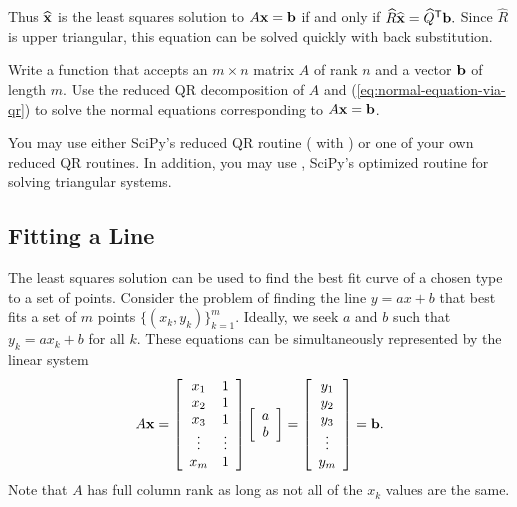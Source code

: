 Thus $\widehat{\mathbf{x}}$ is the least squares solution to $A\mathbf{x}=\mathbf{b}$ if and only if $\widehat{R}\widehat{\mathbf{x}} = \widehat{Q}^{\mathsf T}\mathbf{b}.$
Since $\widehat{R}$ is upper triangular, this equation can be solved quickly with back substitution.

\begin{problem} %
Write a function that accepts an $m \times n$ matrix $A$ of rank $n$ and a vector $\mathbf{b}$ of length $m$.
Use the reduced QR decomposition of $A$ and (\ref{eq:normal-equation-via-qr}) to solve the normal equations corresponding to $A\mathbf{x} = \mathbf{b}$.

You may use either SciPy's reduced QR routine ( with ) or one of your own reduced QR routines.
In addition, you may use , SciPy's optimized routine for solving triangular systems.
\label{prob:lstsq-via-qr}
\end{problem}

\subsection*{Fitting a Line} %

The least squares solution can be used to find the best fit curve of a chosen type to a set of points.
Consider the problem of finding the line $y = ax + b$ that best fits a set of $m$ points $\{(x_k, y_k)\}_{k=1}^m$.
Ideally, we seek $a$ and $b$ such that $y_k = ax_k + b$ for all $k$.
These equations can be simultaneously represented by the linear system
\begin{equation}
A\mathbf{x} =
\left[\begin{array}{cc}
x_1 & 1 \\
x_2 & 1 \\
x_3 & 1 \\
\vdots & \vdots \\
x_m & 1
\end{array}\right]
\left[\begin{array}{c} a \\ b \end{array}\right]
=
\left[\begin{array}{c} y_1 \\ y_2 \\ y_3 \\ \vdots \\ y_m \end{array}\right]
= \mathbf{b}.
\label{eq:linear-least-squares}
\end{equation}
%
Note that $A$ has full column rank as long as not all of the $x_k$ values are the same.

